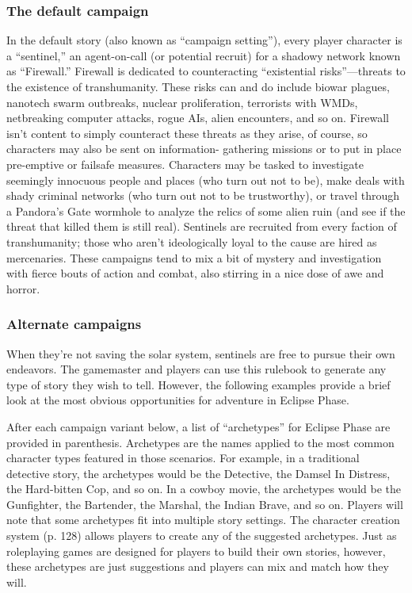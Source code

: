 \subsubsection{The default campaign} \label{sec:default-campaign} 

In the default story (also known as ``campaign setting''), every player character is a ``sentinel,'' an agent-on-call (or potential recruit) for a shadowy network known as ``Firewall.'' Firewall is dedicated to counteracting ``existential risks''—threats to the existence of transhumanity. These risks can and do include biowar plagues, nanotech swarm outbreaks, nuclear proliferation, terrorists with WMDs, netbreaking computer attacks, rogue AIs, alien encounters, and so on. Firewall isn't content to simply counteract these threats as they arise, of course, so characters may also be sent on information- gathering missions or to put in place pre-emptive or failsafe measures. Characters may be tasked to investigate seemingly innocuous people and places (who turn out not to be), make deals with shady criminal networks (who turn out not to be trustworthy), or travel through a Pandora's Gate wormhole to analyze the relics of some alien ruin (and see if the threat that killed them is still real). Sentinels are recruited from every faction of transhumanity; those who aren't ideologically loyal to the cause are hired as mercenaries. These campaigns tend to mix a bit of mystery and investigation with fierce bouts of action and combat, also stirring in a nice dose of awe and horror. 



\subsubsection{Alternate campaigns} \label{sec:alternate-campaigns} 

When they're not saving the solar system, sentinels are free to pursue their own endeavors. The gamemaster and players can use this rulebook to generate any type of story they wish to tell. However, the following examples provide a brief look at the most obvious opportunities for adventure in Eclipse Phase. 

After each campaign variant below, a list of ``archetypes'' for Eclipse Phase are provided in parenthesis. Archetypes are the names applied to the most common character types featured in those scenarios. For example, in a traditional detective story, the archetypes would be the Detective, the Damsel In Distress, the Hard-bitten Cop, and so on. In a cowboy movie, the archetypes would be the Gunfighter, the Bartender, the Marshal, the Indian Brave, and so on. Players will note that some archetypes fit into multiple story settings. The character creation system (p. 128) allows players to create any of the suggested archetypes. Just as roleplaying games are designed for players to build their own stories, however, these archetypes are just suggestions and players can mix and match how they will. 

